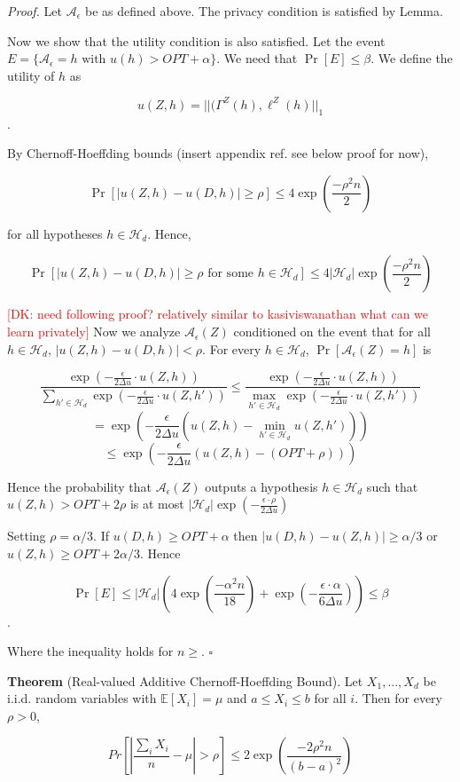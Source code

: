 \documentclass[runningheads]{article}
\newcommand{\dk}[1]{\textcolor{red}{[DK: #1]}}
\newcommand{\A}{\mathcal{A}}
\renewcommand{\H}{\mathcal{H}}
\newcommand{\1}{\mathbbm{1}}
\theoremstyle{definition}
\begin{document}
{\it Proof.} Let $\A_{\epsilon}$ be as defined above. The privacy condition is satisfied by Lemma.

Now we show that the utility condition is also satisfied. Let the event $E = \{\A_{\epsilon} = h \text{ with } u(h) > OPT + \alpha\}$. We need that $\Pr[E] \leq \beta$. We define the utility of $h$ as

$$u(Z,h) = ||(\Gamma^Z(h), \ell^Z(h)||_{1}$$.

By Chernoff-Hoeffding bounds (insert appendix ref. see below proof for now),



$$\Pr[|u(Z,h) - u(D,h)| \geq \rho] \leq 4\exp(\frac{-\rho^2n}{2})$$

for all hypotheses $h \in \H_d$. Hence,

$$\Pr[|u(Z,h) - u(D,h)| \geq \rho \text{ for some } h \in \H_d] \leq 4|\H_d|\exp(\frac{-\rho^2n}{2})$$

\dk{need following proof? relatively similar to kasiviswanathan what can we learn privately}
Now we analyze $\A_\epsilon(Z)$ conditioned on the event that for all $h\in \H_d$, $|u(Z,h) - u(D,h)| < \rho$. For every $h \in \H_d$, $\Pr[\A_\epsilon(Z) = h]$ is

$$\frac{\exp(-\frac{\epsilon}{2\Delta u} \cdot u(Z,h))}{\sum_{h'\in\H_d}\exp(-\frac{\epsilon}{2\Delta u} \cdot u(Z,h'))} \leq \frac{\exp(-\frac{\epsilon}{2\Delta u} \cdot u(Z,h))}{\max_{h'\in\H_d}\exp(-\frac{\epsilon}{2\Delta u} \cdot u(Z,h'))} $$
$$= \exp(-\frac{\epsilon}{2\Delta u}(u(Z,h) - \min_{h'\in\H_d}u(Z,h')))$$
$$\leq \exp(-\frac{\epsilon}{2\Delta u}(u(Z,h) - (OPT + \rho)))$$

Hence the probability that $\A_\epsilon(Z)$ outputs a hypothesis $h \in \H_d$ such that $u(Z,h) > OPT + 2\rho$ is at most $|\H_d|\exp(-\frac{\epsilon\cdot\rho}{2\Delta u})$

Setting $\rho = \alpha/3$. If $u(D,h) \geq OPT + \alpha$ then $|u(D,h) - u(Z,h)| \geq \alpha/3$ or $u(Z,h) \geq OPT + 2\alpha/3$. Hence

$$\Pr[E] \leq |\H_d|(4\exp(\frac{-\alpha^2n}{18}) + \exp(-\frac{\epsilon\cdot\alpha}{6\Delta u})) \leq \beta$$.

Where the inequality holds for $n \geq $. $\square$

{\bf Theorem} (Real-valued Additive Chernoff-Hoeffding Bound). Let $X_1,...,X_d$ be i.i.d. random variables with $\mathbb{E}[X_i] = \mu$ and $a \leq X_i \leq b$ for all $i$. Then for every $\rho > 0$,

$$Pr[|\frac{\sum_i X_i}{n} - \mu| > \rho] \leq 2\exp(\frac{-2\rho^2n}{(b-a)^2})$$
\end{document}
